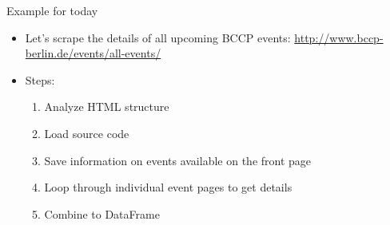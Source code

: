 \begin{frame}{Example for today}
\begin{itemize}
	\item Let's scrape the details of all upcoming BCCP events: \url{http://www.bccp-berlin.de/events/all-events/}
	\item Steps:
		\begin{enumerate}
			\item Analyze HTML structure
			\item Load source code
			\item Save information on events available on the front page
			\item Loop through individual event pages to get details
			\item Combine to DataFrame
		\end{enumerate}
\end{itemize}
\end{frame}


